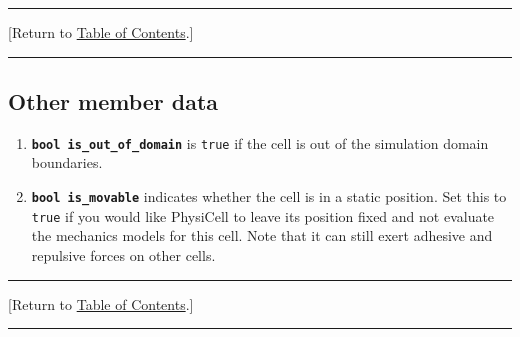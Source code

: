 \documentclass[12pt]{article}
\renewcommand{\v}{\verb}
\newcommand{\smallcode}[1]{\textbf{\texttt{#1}}}
\newcommand{\TOClink}{\begin{center}\hrule\vskip-5pt\phantom{.}\hfill[Return to \hyperlink{TOC}{Table of Contents}.]\hfill\phantom{.}\vskip3pt\hrule\end{center}}
\begin{document}
\TOClink

\subsection{Other member data}
\label{sec:cell_other_member_data}

\begin{enumerate} 
\item 
\smallcode{bool is\_out\_of\_domain} is \v|true| if the cell is out 
of the simulation domain boundaries. 

\item 
\smallcode{bool is\_movable} indicates whether the cell is in a 
static position. Set this to \v|true| if you would like 
PhysiCell to leave its position fixed and not evaluate the 
mechanics models for this cell. Note that it can still 
exert adhesive and repulsive forces on other cells. 
\end{enumerate}

\TOClink
\end{document}
